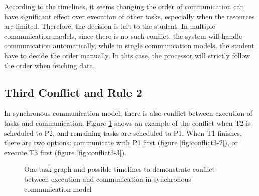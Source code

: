 \documentclass[msc,deptreport, cs]{infthesis}
\begin{document}
According to the timelines, it seems changing the order of communication can have significant effect over execution of other tasks, especially when the resources are limited. Therefore, the decision is left to the student. In multiple communication models, since there is no such conflict, the system will handle communication automatically, while in single communication models, the student have to decide the order manually. In this case, the processor will strictly follow the order when fetching data.

\subsection{Third Conflict and Rule 2} \label{sec:rule2}

In synchronous communication model, there is also conflict between execution of tasks and communication. Figure \ref{fig:conflict3} shows an example of the conflict when T2 is scheduled to P2, and remaining tasks are scheduled to P1. When T1 finishes, there are two options: communicate with P1 first (figure \ref{fig:conflict3-2}), or execute T3 first (figure \ref{fig:conflict3-3}).

\begin{figure}[!htb]
  \centering
   \hspace{1em}
   \hspace{1em}
  \caption{One task graph and possible timelines to demonstrate conflict between execution and communication in synchronous communication model}
  \label{fig:conflict3}
\end{figure}
\end{document}
